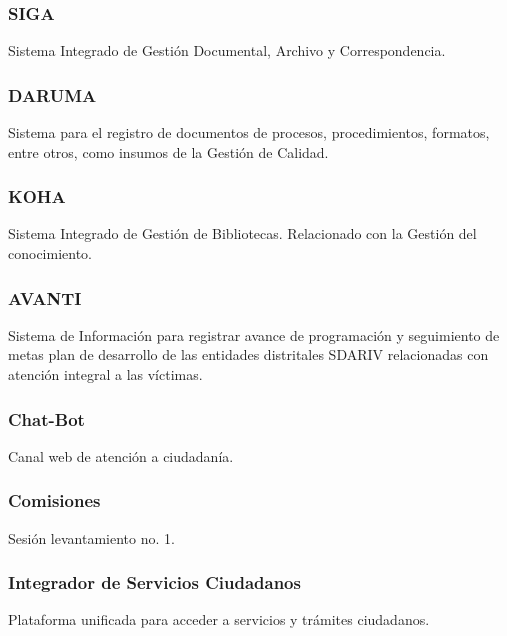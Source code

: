 \documentclass[
	a4paper, %
	12pt, %
]{include/CSSullivanBusinessReport}
\begin{document}
\subsubsection{SIGA}\label{sec:siga}

Sistema Integrado de Gestión Documental, Archivo y Correspondencia.

\subsubsection{DARUMA}\label{sec:daruma}

Sistema para el registro de documentos de procesos, procedimientos,
formatos, entre otros, como insumos de la Gestión de Calidad.

\subsubsection{KOHA}\label{sec:koha}

Sistema Integrado de Gestión de Bibliotecas. Relacionado con la Gestión
del conocimiento.

\subsubsection{AVANTI}\label{sec:avanti}

Sistema de Información para registrar avance de programación y
seguimiento de metas plan de desarrollo de las entidades distritales
SDARIV relacionadas con atención integral a las víctimas.

\subsubsection{Chat-Bot}\label{sec:chat-bot}

Canal web de atención a ciudadanía.

\subsubsection{Comisiones}\label{sec:comisiones}

Sesión levantamiento no. 1.

\subsubsection{Integrador de Servicios
Ciudadanos}\label{sec:integrador-de-servicios-ciudadanos}

Plataforma unificada para acceder a servicios y trámites ciudadanos.
\end{document}
